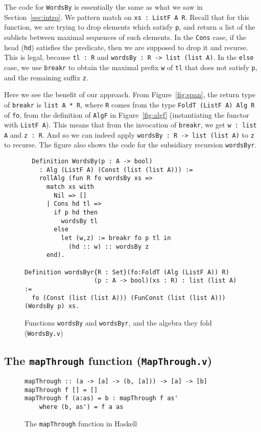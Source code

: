 \documentclass[a4paper,USenglish]{lipics-v2021}
\begin{document}
The code for \verb|WordsBy| is essentially
the same as what we saw in Section~\ref{sec:intro}.  We pattern match
on \verb|xs : ListF A R|.  Recall that for this function, we are
trying to drop elements which satisfy \verb|p|, and return a list of
the sublists between maximal sequences of such elements.  In the
\verb|Cons| case, if the head (\verb|hd|) satisfies the predicate, then we are
supposed to drop it and recurse.  This is legal, because \verb|tl : R|
and \verb|wordsBy : R -> list (list A)|.  In the \verb|else| case,
we use \verb|breakr| to obtain the maximal prefix \verb|w| of \verb|tl| that
does not satisfy \verb|p|, and the remaining suffix \verb|z|.

Here we see the benefit of our approach.  From Figure~\ref{fig:span},
the return type of \verb|breakr| is \verb|list A * R|, where \verb|R|
comes from the type \verb|FoldT (ListF A) Alg R| of
\verb|fo|, from the definition
of \verb|AlgF| in Figure~\ref{fig:algf} (instantiating the functor
with \verb|ListF A|).  This means that from the invocation of
\verb|breakr|, we get \verb|w : list A| and \verb|z : R|.  And so we
can indeed apply \verb|wordsBy : R -> list (list A)| to
\verb|z| to recurse.  The figure also shows the code for the subsidiary
recursion \verb|wordsByr|.

\begin{figure}
\begin{verbatim}
  Definition WordsBy(p : A -> bool)
    : Alg (ListF A) (Const (list (list A))) :=
    rollAlg (fun R fo wordsBy xs => 
      match xs with
        Nil => [] 
      | Cons hd tl =>
        if p hd then
          wordsBy tl
        else
          let (w,z) := breakr fo p tl in
            (hd :: w) :: wordsBy z
      end).

Definition wordsByr{R : Set}(fo:FoldT (Alg (ListF A)) R)
                   (p : A -> bool)(xs : R) : list (list A) :=
  fo (Const (list (list A))) (FunConst (list (list A))) (WordsBy p) xs.
\end{verbatim}
\caption{Functions  \texttt{wordsBy} and \texttt{wordsByr}, and the algebra they
  fold (\texttt{WordsBy.v})}
\label{fig:wordsby}
\end{figure}

\subsection{The \texttt{mapThrough} function (\texttt{MapThrough.v})}

\begin{figure}
\begin{verbatim}
mapThrough :: (a -> [a] -> (b, [a])) -> [a] -> [b]
mapThrough f [] = []
mapThrough f (a:as) = b : mapThrough f as'
    where (b, as') = f a as
\end{verbatim}
\caption{The \texttt{mapThrough} function in Haskell}
\label{fig:mapthroughhs}
\end{figure}
\end{document}
